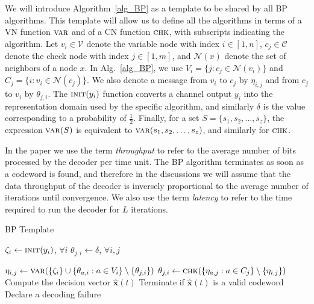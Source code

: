 \documentclass[12pt,journal,twoside,draftcls,onecolumn]{IEEEtran}
\newcommand{\bvec}[1]{\mathbf{#1}}
\begin{document}
We will introduce Algorithm~\ref{alg_BP} as a template to be shared by all BP algorithms. This template will allow us to define all the algorithms in terms of a VN function $\textsc{var}$ and of a CN function $\textsc{chk}$, with subscripts indicating the algorithm.
Let $v_i \in \mathcal{V}$ denote the variable node with index $i \in [1,n]$, $c_j \in \mathcal{C}$ denote the check node with index $j \in [1,m]$, and $\mathcal{N}(x)$ denote the set of neighbors of a node $x$. In Alg.~\ref{alg_BP}, we use $V_i = \{j : c_j \in \mathcal{N}(v_i)\}$ and $C_j = \{i : v_i \in \mathcal{N}(c_j)\}$. We also denote a message from $v_i$ to $c_j$ by $\eta_{i,j}$ and from $c_j$ to $v_i$ by $\theta_{j,i}$. The $\textsc{init}(y_i)$ function converts a channel output $y_i$ into the representation domain used by the specific algorithm, and similarly $\delta$ is the value corresponding to a probability of $\frac{1}{2}$.
Finally, for a set $S = \{s_1, s_2, \ldots, s_z\}$, the expression $\textsc{var}(S)$ is equivalent to $\textsc{var}(s_1, s_2, \ldots, s_z)$, and similarly for $\textsc{chk}$.

In the paper we use the term \emph{throughput} to refer to the average number of bits processed by the decoder per time unit.
The BP algorithm terminates as soon as a codeword is found, and therefore in the discussions we will assume that the data throughput of the decoder is inversely proportional to the average number of iterations until convergence. We also use the term \emph{latency} to refer to the time required to run the decoder for $L$ iterations.

\begin{algorithm}
\caption{BP Template}\label{alg_BP}
\begin{algorithmic}
\Procedure{BP}{$\bvec{y}$}

	\State $\zeta_i \gets \textsc{init}(y_i)$, $\forall i$
	\State $\theta_{j,i} \gets \delta$, $\forall i, j$ 
	
	
				\State $\eta_{i,j} \gets \textsc{var}( \{\zeta_i\} \cup \{ \theta_{a,i} : a \in V_i \} \setminus \{\theta_{j,i}\} )$
			\EndFor
		\EndFor
{}
				\State $\theta_{j,i} \gets \textsc{chk}( \{ \eta_{a,j} : a \in C_j \} \setminus \{\eta_{i,j}\} )$
			\EndFor
		\EndFor		
		\State Compute the decision vector $\bvec{\hat{x}}(t)$
		\State Terminate if $\bvec{\hat{x}}(t)$ is a valid codeword
	\EndFor
	\State Declare a decoding failure
\EndProcedure
\end{algorithmic}
\end{algorithm}
\end{document}
